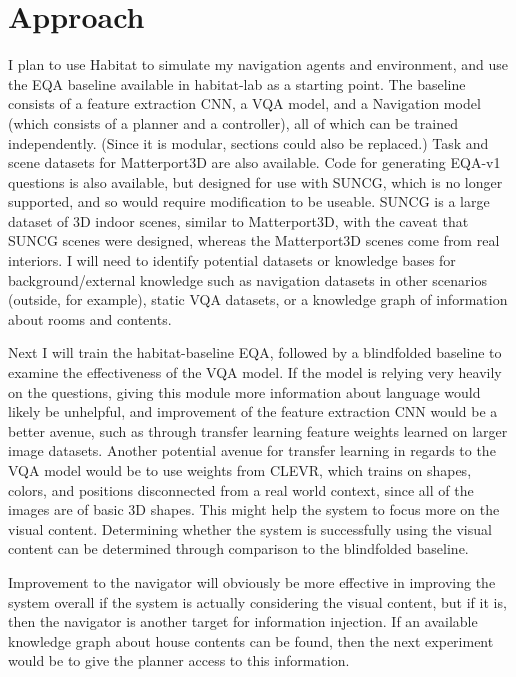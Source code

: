 \documentclass{article}
\begin{document}
\section{Approach}
I plan to use Habitat to simulate my navigation agents and environment, and use the EQA baseline available in habitat-lab as a starting point. The baseline consists of a feature extraction CNN, a VQA model, and a Navigation model (which consists of a planner and a controller), all of which can be trained independently. (Since it is modular, sections could also be replaced.) Task and scene datasets for Matterport3D are also available. Code for generating EQA-v1 questions is also available, but designed for use with SUNCG, %
which is no longer supported, and so would require modification to be useable\cite{embodiedqa}\cite{suncg}. SUNCG is a large dataset of 3D indoor scenes, similar to Matterport3D, with the caveat that SUNCG scenes were designed, whereas the Matterport3D scenes come from real interiors. I will need to identify potential datasets or knowledge bases for background/external knowledge such as navigation datasets in other scenarios (outside, for example), static VQA datasets, or a knowledge graph of information about rooms and contents. 


Next I will train the habitat-baseline EQA, followed by a blindfolded baseline to examine the effectiveness of the VQA model. If the model is relying very heavily on the questions, giving this module more information about language would likely be unhelpful, and improvement of the feature extraction CNN would be a better avenue, such as through transfer learning feature weights learned on larger image datasets. Another potential avenue for transfer learning in regards to the VQA model would be to use weights from CLEVR, which trains on shapes, colors, and positions disconnected from a real world context, since all of the images are of basic 3D shapes\cite{clevr}. This might help the system to focus more on the visual content. Determining whether the system is successfully using the visual content can be determined through comparison to the blindfolded baseline. 

Improvement to the navigator will obviously be more effective in improving the system overall if the system is actually considering the visual content, but if it is, then the navigator is another target for information injection. If an available knowledge graph about house contents can be found, then the next experiment would be to give the planner access to this information. 
\end{document}
